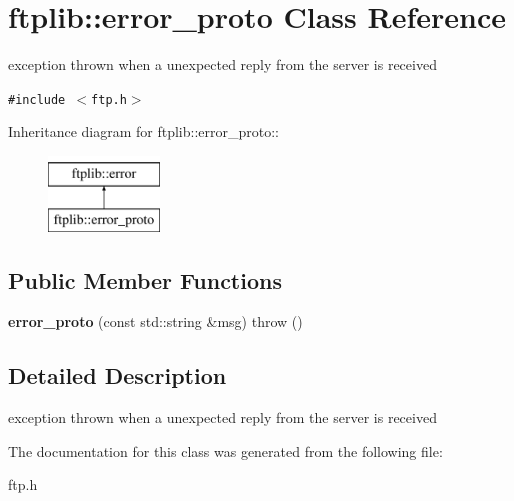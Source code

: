 \hypertarget{classftplib_1_1error__proto}{
\section{ftplib::error\_\-proto Class Reference}
\label{classftplib_1_1error__proto}
}
exception thrown when a unexpected reply from the server is received  


{\tt \#include $<$ftp.h$>$}

Inheritance diagram for ftplib::error\_\-proto::\begin{figure}[H]
\begin{center}
\leavevmode
\includegraphics[height=2cm]{classftplib_1_1error__proto}
\end{center}
\end{figure}
\subsection*{Public Member Functions}
\begin{CompactItemize}
\item 
\hypertarget{classftplib_1_1error__proto_4d9a71a8162f838cb1cdd2997f64819b}{
\textbf{error\_\-proto} (const std::string \&msg)  throw ()}
\label{classftplib_1_1error__proto_4d9a71a8162f838cb1cdd2997f64819b}

\end{CompactItemize}


\subsection{Detailed Description}
exception thrown when a unexpected reply from the server is received 

The documentation for this class was generated from the following file:\begin{CompactItemize}
\item 
ftp.h\end{CompactItemize}
